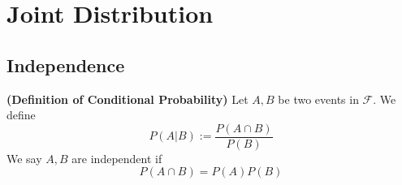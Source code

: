 \documentclass{report}
\begin{document}
\chapter{Joint Distribution}
\section{Independence}
\begin{definition}
\label{3.0.1}
\textbf{(Definition of Conditional Probability)} Let $A,B$ be two events in  $\mathcal{F}$. We define
\begin{equation*}
P\left(A|B \right):=\frac{P\left(A\cap B \right)}{P\left(B \right)}
\end{equation*}
We say $A,B$ are independent if 
 \begin{equation*}
P\left(A\cap B \right)=P\left(A \right)P\left(B \right)
\end{equation*}
\end{definition}
\begin{theorem}
\label{3.0.2}
\textbf{(Independence) 
\begin{equation*}
A,B\text{ are independent }\iff P\left( A|B\right)=P\left(A \right)
\end{equation*}
\end{theorem}
\end{document}
